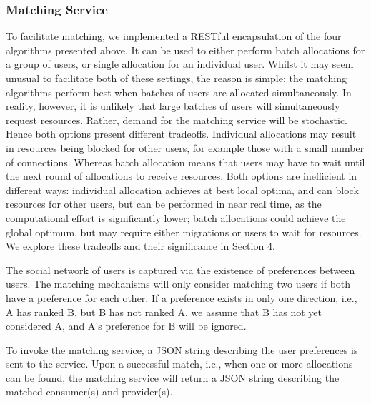 \documentclass[a4paper,12pt]{article}
\begin{document}
	\subsubsection{Matching Service}
To facilitate matching, we implemented a RESTful encapsulation of the four algorithms presented above. It can be used
to either perform batch allocations for a group of users, or
single allocation for an individual user. Whilst it may seem
unusual to facilitate both of these settings, the reason is simple: the matching algorithms perform best when batches of
users are allocated simultaneously. In reality, however, it is
unlikely that large batches of users will simultaneously
request resources. Rather, demand for the matching service
will be stochastic. Hence both options present different
tradeoffs. Individual allocations may result in resources
being blocked for other users, for example those with a
small number of connections. Whereas batch allocation
means that users may have to wait until the next round of
allocations to receive resources. Both options are inefficient
in different ways: individual allocation achieves at best local
optima, and can block resources for other users, but can be
performed in near real time, as the computational effort is
significantly lower; batch allocations could achieve the
global optimum, but may require either migrations or users
to wait for resources. We explore these tradeoffs and their
significance in Section 4.
	\par The social network of users is captured via the existence
of preferences between users. The matching mechanisms
will only consider matching two users if both have a preference for each other. If a preference exists in only one direction, i.e., A has ranked B, but B has not ranked A, we
assume that B has not yet considered A, and A’s preference
for B will be ignored.

	\par To invoke the matching service, a JSON string describing
the user preferences is sent to the service. Upon a successful
match, i.e., when one or more allocations can be found, the
matching service will return a JSON string describing the
matched consumer(s) and provider(s).
\end{document}
